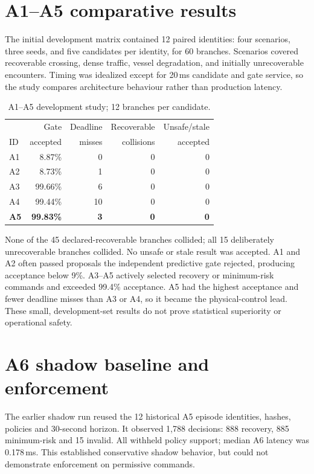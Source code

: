 \documentclass[sigconf,nonacm]{acmart}
\begin{document}
\section{A1--A5 comparative results}
The initial development matrix contained 12 paired identities: four scenarios, three seeds, and five candidates per identity, for 60 branches. Scenarios covered recoverable crossing, dense traffic, vessel degradation, and initially unrecoverable encounters. Timing was idealized except for 20\,ms candidate and gate service, so the study compares architecture behaviour rather than production latency.

\begin{table}[t]
\centering
\caption{A1--A5 development study; 12 branches per candidate.}
\label{tab:controller}
\scriptsize
\begin{tabular}{@{}lrrrr@{}}
\toprule
 & Gate & Deadline & Recoverable & Unsafe/stale\\
ID & accepted & misses & collisions & accepted\\
\midrule
A1 & 8.87\% & 0 & 0 & 0\\
A2 & 8.73\% & 1 & 0 & 0\\
A3 & 99.66\% & 6 & 0 & 0\\
A4 & 99.44\% & 10 & 0 & 0\\
\textbf{A5} & \textbf{99.83\%} & \textbf{3} & \textbf{0} & \textbf{0}\\
\bottomrule
\end{tabular}
\end{table}

None of the 45 declared-recoverable branches collided; all 15 deliberately unrecoverable branches collided. No unsafe or stale result was accepted. A1 and A2 often passed proposals the independent predictive gate rejected, producing acceptance below 9\%. A3--A5 actively selected recovery or minimum-risk commands and exceeded 99.4\% acceptance. A5 had the highest acceptance and fewer deadline misses than A3 or A4, so it became the physical-control lead. These small, development-set results do not prove statistical superiority or operational safety.

\section{A6 shadow baseline and enforcement}
\begin{sloppypar}
The earlier shadow run reused the 12 historical A5 episode identities, hashes, policies and 30-second horizon. It observed 1,788 decisions: 888 recovery, 885 minimum-risk and 15 invalid. All withheld policy support; median A6 latency was 0.178\,ms. This established conservative shadow behavior, but could not demonstrate enforcement on permissive commands.
\end{sloppypar}
\end{document}
